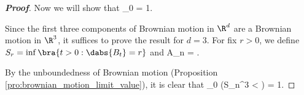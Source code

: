 \begin{proof}[\bf Proof]
Now we will show that
\be
\pro_0  = 1.
\ee


Since the first three components of Brownian motion in $\R^d$ are a Brownian motion in $\R^3$, it suffices to prove the result for $d = 3$. For fix $r>0$, we define $S_r = \inf\bra{t >0:\dabs{B_t}=r}$ and
\be
A_n = .
\ee

By the unboundedness of Brownian motion (Proposition \ref{pro:brownian_motion_limit_value}), it is clear that
\be
\pro_0 (S_{n^3} < \infty) = 1.
\ee


\end{proof}
